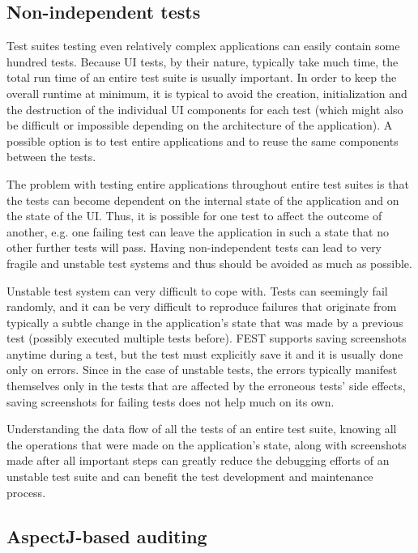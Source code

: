 \subsection {Non-independent tests}

Test suites testing even relatively complex applications can easily contain some hundred tests. Because UI tests, by their nature, typically take much time, the total run time of an entire test suite is usually important. In order to keep the overall runtime at minimum, it is typical to avoid the creation, initialization and the destruction of the individual UI components for each test (which might also be difficult or impossible depending on the architecture of the application). A possible option is to test entire applications and to reuse the same components between the tests.

The problem with testing entire applications throughout entire test suites is that the tests can become dependent on the internal state of the application and on the state of the UI. Thus, it is possible for one test to affect the outcome of another, e.g. one failing test can leave the application in such a state that no other further tests will pass. Having non-independent tests can lead to very fragile and unstable test systems and thus should be avoided as much as possible.

Unstable test system can very difficult to cope with. Tests can seemingly fail randomly, and it can be very difficult to reproduce failures that originate from typically a subtle change in the application's state that was made by a previous test (possibly executed multiple tests before). FEST supports saving screenshots anytime during a test, but the test must explicitly save it and it is usually done only on errors. Since in the case of unstable tests, the errors typically manifest themselves only in the tests that are affected by the erroneous tests' side effects, saving screenshots for failing tests does not help much on its own.

Understanding the data flow of all the tests of an entire test suite, knowing all the operations that were made on the application's state, along with screenshots made after all important steps can greatly reduce the debugging efforts of an unstable test suite and can benefit the test development and maintenance process.

\subsection {AspectJ-based auditing}

